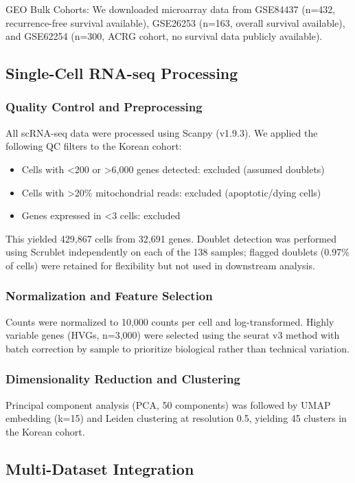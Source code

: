 \documentclass[12pt,twoside]{article}
\begin{document}
GEO Bulk Cohorts: We downloaded microarray data from GSE84437 (n=432, recurrence-free survival available), GSE26253 (n=163, overall survival available), and GSE62254 (n=300, ACRG cohort, no survival data publicly available).

\subsection{Single-Cell RNA-seq Processing}

\subsubsection{Quality Control and Preprocessing}
All scRNA-seq data were processed using Scanpy (v1.9.3). We applied the following QC filters to the Korean cohort:
\begin{itemize}
    \item Cells with <200 or >6,000 genes detected: excluded (assumed doublets)
    \item Cells with >20\% mitochondrial reads: excluded (apoptotic/dying cells)
    \item Genes expressed in <3 cells: excluded
\end{itemize}

This yielded 429,867 cells from 32,691 genes. Doublet detection was performed using Scrublet \cite{Wolock2019} independently on each of the 138 samples; flagged doublets (0.97\% of cells) were retained for flexibility but not used in downstream analysis.

\subsubsection{Normalization and Feature Selection}
Counts were normalized to 10,000 counts per cell and log-transformed. Highly variable genes (HVGs, n=3,000) were selected using the seurat v3 method with batch correction by sample to prioritize biological rather than technical variation.

\subsubsection{Dimensionality Reduction and Clustering}
Principal component analysis (PCA, 50 components) was followed by UMAP embedding (k=15) and Leiden clustering at resolution 0.5, yielding 45 clusters in the Korean cohort.

\subsection{Multi-Dataset Integration}
\end{document}
